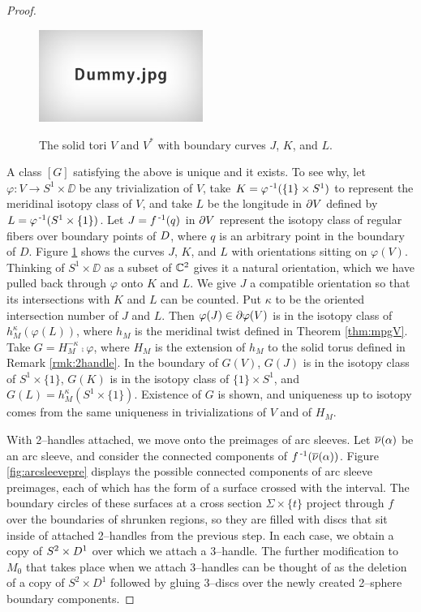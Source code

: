 \begin{proof}
	\begin{figure}
		\centering
		\captionsetup{justification=centering}
		\caption{The solid tori $V$ and $V^*$ with boundary curves $J$, $K$, and $L$.}
		\includegraphics[height=3cm]{figures/dummy.jpg}
		\label{fig:VV*}
	\end{figure}
	
	A class $[G]$ satisfying the above is unique and it exists.
	To see why, let $\varphi:V\to S^1\times\DD$ be any trivialization of $V$, take $K=\varphi^{\,\text{-}1}(\{1\}\times S^1)$ to represent the meridinal isotopy class of $V$, and take $L$ be the longitude in $\partial V$ defined by $L=\varphi^{\,\text{-}1}(S^1\times\{1\})$.
	Let $J=f^{\,\text{-}1}(q)$ in $\partial V$ represent the isotopy class of regular fibers over boundary points of $D$, where $q$ is an arbitrary point in the boundary of $D$.	
	Figure \ref{fig:VV*} shows the curves $J$, $K$, and $L$ with orientations sitting on $\varphi(V)$.
	Thinking of $S^1\times\DD$ as a subset of $\mathbb{C}^2$ gives it a natural orientation, which we have pulled back through $\varphi$ onto $K$ and $L$.
	We give $J$ a compatible orientation so that its intersections with $K$ and $L$ can be counted.
	Put $\kappa$ to be the oriented intersection number of $J$ and $L$.
	Then $\varphi(J)\in \partial\varphi(V)$ is in the isotopy class of $h_M^{\kappa}(\varphi(L))$, where $h_M$ is the meridinal twist defined in Theorem \ref{thm:mpgV}.
	Take $G=H_M^{-\kappa}\comp\varphi$, where $H_M$ is the extension of $h_M$ to the solid torus defined in Remark \ref{rmk:2handle}.
	In the boundary of $G(V)$, $G(J)$ is in the isotopy class of $S^1\times\{1\}$, $G(K)$ is in the isotopy class of $\{1\}\times S^1$, and $G(L)=h_M^\kappa(S^1\times\{1\})$.
	Existence of $G$ is shown, and uniqueness up to isotopy comes from the same uniqueness in trivializations of $V$ and of $H_M$.
		
	With 2--handles attached, we move onto the preimages of arc sleeves.
	Let $\overline{\nu}(\alpha)$ be an arc sleeve, and consider the connected components of $f^{\,\text{-}1}(\overline{\nu}(\alpha))$.
	Figure \ref{fig:arcsleevepre} displays the possible connected components of arc sleeve preimages, each of which has the form of a surface crossed with the interval.
	The boundary circles of these surfaces at a cross section $\Sigma\times\{t\}$ project through $f$ over the boundaries of shrunken regions, so they are filled with discs that sit inside of attached 2--handles from the previous step.
	In each case, we obtain a copy of $S^2\times D^1$ over which we attach a 3--handle.
	The further modification to $M_0$ that takes place when we attach 3--handles can be thought of as the deletion of a copy of $S^2\times D^1$ followed by gluing 3--discs over the newly created 2--sphere boundary components.
	

\end{proof}
